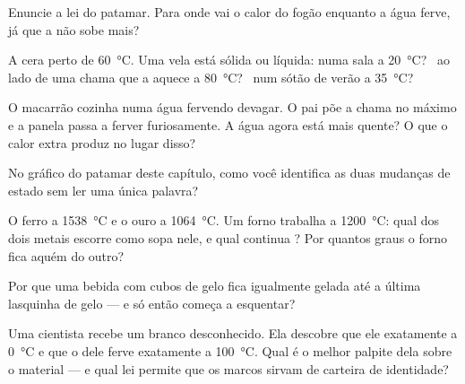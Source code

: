 \begin{exercise}[$\star$]\label{exo:g4:changes-of-state:4}
Enuncie a lei do patamar. Para onde vai o calor do fogão enquanto a
água ferve, já que a  não sobe mais?
\end{exercise}

\begin{exercise}[$\star$]\label{exo:g4:changes-of-state:5}
A cera  perto de \qty{60}{\celsius}. Uma vela está sólida ou
líquida: numa sala a \qty{20}{\celsius}? \ ao lado de uma chama que a
aquece a \qty{80}{\celsius}? \ num sótão de verão a
\qty{35}{\celsius}?
\end{exercise}

\begin{exercise}[$\star$]\label{exo:g4:changes-of-state:6}
O macarrão cozinha numa água fervendo devagar. O pai põe a chama no
máximo e a panela passa a ferver furiosamente. A água agora está mais
quente? O que o calor extra produz no lugar disso?
\end{exercise}

\begin{exercise}[$\star$]\label{exo:g4:changes-of-state:7}
No gráfico do patamar deste capítulo, como você identifica as duas
mudanças de estado sem ler uma única palavra?
\end{exercise}

\begin{exercise}[$\star$]\label{exo:g4:changes-of-state:8}
O ferro  a \qty{1538}{\celsius} e o ouro a
\qty{1064}{\celsius}. Um forno trabalha a \qty{1200}{\celsius}: qual
dos dois metais escorre como sopa nele, e qual continua ? Por
quantos graus o forno fica aquém do outro?
\end{exercise}

\begin{exercise}[$\star$]\label{exo:g4:changes-of-state:9}
Por que uma bebida com cubos de gelo fica igualmente gelada até a
última lasquinha de gelo --- e só então começa a esquentar?
\end{exercise}

\begin{exercise}[$\star\star$]\label{exo:g4:changes-of-state:10}
Uma cientista recebe um  branco desconhecido. Ela descobre que
ele  exatamente a \qty{0}{\celsius} e que o  dele ferve
exatamente a \qty{100}{\celsius}. Qual é o melhor palpite dela sobre
o material --- e qual lei permite que os marcos sirvam de carteira de
identidade?
\end{exercise}

